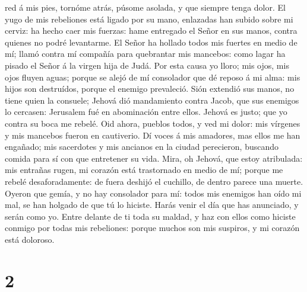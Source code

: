 red á mis pies, tornóme atrás, púsome asolada, y que siempre tenga
dolor.  El yugo de mis rebeliones está ligado por su
mano, enlazadas han subido sobre mi cerviz: ha hecho caer mis fuerzas:
hame entregado el Señor en sus manos, contra quienes no podré
levantarme.  El Señor ha hollado todos mis fuertes en
medio de mí; llamó contra mí compañía para quebrantar mis mancebos: como
lagar ha pisado el Señor á la virgen hija de Judá.  Por
esta causa yo lloro; mis ojos, mis ojos fluyen aguas; porque se alejó de
mí consolador que dé reposo á mi alma: mis hijos son destruídos, porque
el enemigo prevaleció.  Sión extendió sus manos, no tiene
quien la consuele; Jehová dió mandamiento contra Jacob, que sus enemigos
lo cercasen: Jerusalem fué en abominación entre ellos. 
Jehová es justo; que yo contra su boca me rebelé. Oid ahora, pueblos
todos, y ved mi dolor: mis vírgenes y mis mancebos fueron en cautiverio.
 Dí voces á mis amadores, mas ellos me han engañado; mis
sacerdotes y mis ancianos en la ciudad perecieron, buscando comida para
sí con que entretener su vida.  Mira, oh Jehová, que
estoy atribulada: mis entrañas rugen, mi corazón está trastornado en
medio de mí; porque me rebelé desaforadamente: de fuera deshijó el
cuchillo, de dentro parece una muerte.  Oyeron que gemía,
y no hay consolador para mí: todos mis enemigos han oído mi mal, se han
holgado de que tú lo hiciste. Harás venir el día que has anunciado, y
serán como yo.  Entre delante de ti toda su maldad, y haz
con ellos como hiciste conmigo por todas mis rebeliones: porque muchos
son mis suspiros, y mi corazón está doloroso.

\hypertarget{section-1}{%
\section{2}\label{section-1}}

